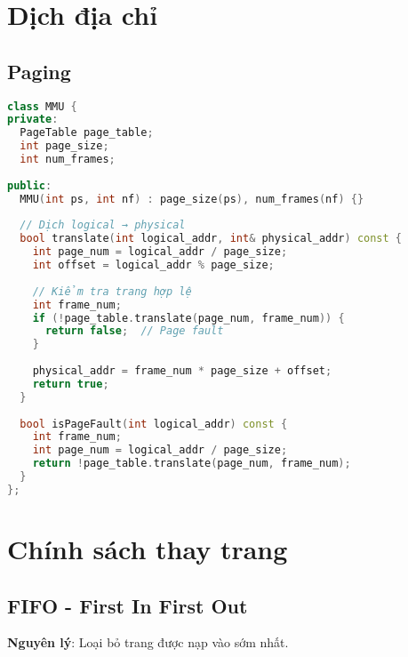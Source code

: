 \section{Dịch địa chỉ}

\subsection{Paging}

\begin{lstlisting}[language=C++,caption={Dịch địa chỉ Paging}]
class MMU {
private:
  PageTable page_table;
  int page_size;
  int num_frames;
  
public:
  MMU(int ps, int nf) : page_size(ps), num_frames(nf) {}
  
  // Dịch logical → physical
  bool translate(int logical_addr, int& physical_addr) const {
    int page_num = logical_addr / page_size;
    int offset = logical_addr % page_size;
    
    // Kiểm tra trang hợp lệ
    int frame_num;
    if (!page_table.translate(page_num, frame_num)) {
      return false;  // Page fault
    }
    
    physical_addr = frame_num * page_size + offset;
    return true;
  }
  
  bool isPageFault(int logical_addr) const {
    int frame_num;
    int page_num = logical_addr / page_size;
    return !page_table.translate(page_num, frame_num);
  }
};
\end{lstlisting}

\section{Chính sách thay trang}

\subsection{FIFO - First In First Out}

\textbf{Nguyên lý}: Loại bỏ trang được nạp vào sớm nhất.

